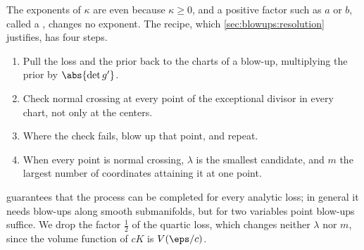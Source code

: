 \begin{refsection}
The exponents of $\kappa$ are even because $\kappa\ge0$, and a positive factor such as $a$ or $b$, called a , changes no exponent. The recipe, which \cref{sec:blowups:resolution} justifies, has four steps.
\begin{enumerate}
\item Pull the loss and the prior back to the charts of a blow-up, multiplying the prior by $\abs{\det g'}$.
\item Check normal crossing at every point of the exceptional divisor in every chart, not only at the centers.
\item Where the check fails, blow up that point, and repeat.
\item When every point is normal crossing, $\lambda$ is the smallest candidate, and $m$ the largest number of coordinates attaining it at one point.
\end{enumerate}
 guarantees that the process can be completed for every analytic loss; in general it needs blow-ups along smooth submanifolds, but for two variables point blow-ups suffice. We drop the factor $\frac12$ of the quartic loss, which changes neither $\lambda$ nor $m$, since the volume function of $cK$ is $V(\eps/c)$.


\end{refsection}
